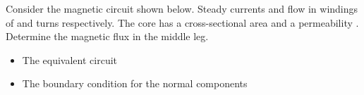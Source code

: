 
\begin{ELexample}{}

Consider the magnetic circuit shown below. Steady currents  and  flow in windings of  and  turns respectively. The core has a cross-sectional area  and a permeability \ELim{\mu}. Determine the magnetic flux in the middle leg.


\begin{ELsolution}

\begin{itemize}
\tightlist
\item
  The equivalent circuit
\end{itemize}



\end{ELsolution}

\end{ELexample}

\ELhold


\begin{ELunit}


\begin{itemize}
\tightlist
\item
  The boundary condition for the normal components
\end{itemize}


\end{ELunit}

